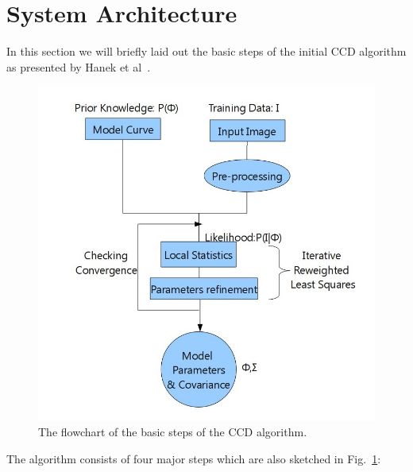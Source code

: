 \documentclass[conference]{IEEEtran}
\begin{document}
\section{System Architecture}
\label{sec:arch}
In this section we will briefly laid out the basic steps of the initial
CCD algorithm as presented by Hanek et al~\cite{hanek2004contracting}.
\begin{figure}[htb]
  \centering
  \includegraphics[width=\columnwidth]{images/flowchart.jpg}
  \caption{The flowchart of the basic steps of the CCD algorithm.}
  \label{fig:flowchart}
\end{figure}
The algorithm consists of four major steps which are also sketched in Fig.~\ref{fig:flowchart}:
\end{document}
